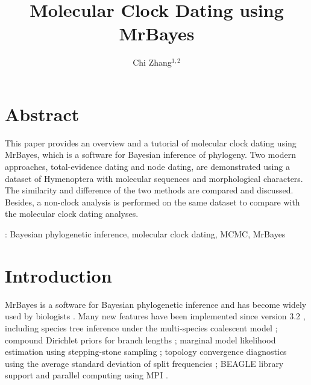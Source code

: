 \documentclass[12pt]{article}
\begin{document}
\title{Molecular Clock Dating using MrBayes}
\author{Chi Zhang$^{1,2}$}
\maketitle


\newpage
\section*{Abstract}

This paper provides an overview and a tutorial of molecular clock dating using MrBayes, which is a software for Bayesian inference of phylogeny. 
Two modern approaches, total-evidence dating and node dating, are demonstrated using a dataset of Hymenoptera with molecular sequences and morphological characters. 
The similarity and difference of the two methods are compared and discussed. 
Besides, a non-clock analysis is performed on the same dataset to compare with the molecular clock dating analyses.

\bigskip
{}: Bayesian phylogenetic inference, molecular clock dating, MCMC, MrBayes

\section{Introduction}

MrBayes is a software for Bayesian phylogenetic inference \citep{Huelsenbeck:2001jt, Ronquist:2003gt} and has become widely used by biologists \citep{VanNoorden:2014hn}.
Many new features have been implemented since version 3.2 \citep{Ronquist:2012ir}, 
including species tree inference under the multi-species coalescent model \citep{Liu:2008hl, Liu:2009hf};
compound Dirichlet priors for branch lengths \citep{Rannala:2012ke, Zhang:2012ke};
marginal model likelihood estimation using stepping-stone sampling \citep{Xie:2011it};
topology convergence diagnostics using the average standard deviation of split frequencies \citep{Lakner:2008dn};
BEAGLE library support \citep{Ayres:2012gf} and parallel computing using MPI \citep{Altekar:2004jz}.
\end{document}
